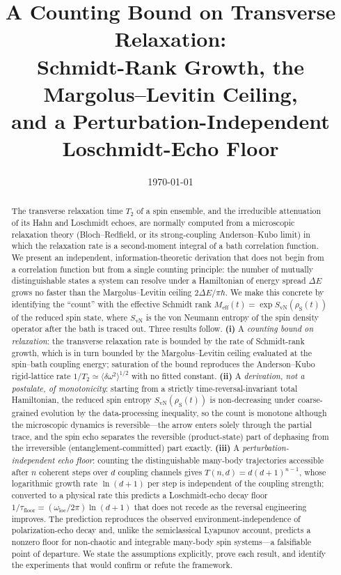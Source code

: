 \documentclass[twocolumn,10pt,a4paper]{article}
\title{\textbf{A Counting Bound on Transverse Relaxation:\\[2pt]
Schmidt-Rank Growth, the Margolus--Levitin Ceiling,\\
and a Perturbation-Independent Loschmidt-Echo Floor}}
\author{}
\date{\today}
\theoremstyle{thmstyle}
\theoremstyle{definition}
\theoremstyle{remark}
\newcommand{\sysrho}{\rho_{\mathrm{S}}}
\newcommand{\Svn}{S_{\mathrm{vN}}}
\newcommand{\Meff}{M_{\mathrm{eff}}}
\newcommand{\Ttwo}{T_{2}}
\begin{document}
\maketitle

\begin{abstract}
\noindent
The transverse relaxation time $\Ttwo$ of a spin ensemble, and the
irreducible attenuation of its Hahn and Loschmidt echoes, are normally
computed from a microscopic relaxation theory (Bloch--Redfield, or its
strong-coupling Anderson--Kubo limit) in which the relaxation rate is a
second-moment integral of a bath correlation function. We present an
independent, information-theoretic derivation that does not begin from a
correlation function but from a single counting principle: the number of
mutually distinguishable states a system can resolve under a Hamiltonian
of energy spread $\Delta E$ grows no faster than the Margolus--Levitin
ceiling $2\Delta E/\pi\hbar$. We make this concrete by identifying the
``count'' with the effective Schmidt rank $\Meff(t)=\exp \Svn(\sysrho(t))$
of the reduced spin state, where $\Svn$ is the von Neumann entropy of the
spin density operator after the bath is traced out. Three results follow.
\textbf{(i)} A \emph{counting bound on relaxation}: the transverse
relaxation rate is bounded by the rate of Schmidt-rank growth, which is
in turn bounded by the Margolus--Levitin ceiling evaluated at the
spin--bath coupling energy; saturation of the bound reproduces the
Anderson--Kubo rigid-lattice rate $1/\Ttwo\simeq\langle\delta\omega^{2}
\rangle^{1/2}$ with no fitted constant. \textbf{(ii)} A \emph{derivation,
not a postulate, of monotonicity}: starting from a strictly
time-reversal-invariant total Hamiltonian, the reduced spin entropy
$\Svn(\sysrho(t))$ is non-decreasing under coarse-grained evolution by
the data-processing inequality, so the count is monotone although the
microscopic dynamics is reversible---the arrow enters solely through the
partial trace, and the spin echo separates the reversible
(product-state) part of dephasing from the irreversible
(entanglement-committed) part exactly. \textbf{(iii)} A
\emph{perturbation-independent echo floor}: counting the distinguishable
many-body trajectories accessible after $n$ coherent steps over $d$
coupling channels gives $T(n,d)=d(d+1)^{n-1}$, whose logarithmic growth
rate $\ln(d{+}1)$ per step is independent of the coupling strength;
converted to a physical rate this predicts a Loschmidt-echo decay floor
$1/\tau_{\mathrm{floor}}=(\omega_{\mathrm{loc}}/2\pi)\ln(d{+}1)$ that does
not recede as the reversal engineering improves. The prediction
reproduces the observed environment-independence of polarization-echo
decay and, unlike the semiclassical Lyapunov account, predicts a nonzero
floor for non-chaotic and integrable many-body spin systems---a
falsifiable point of departure. We state the assumptions explicitly,
prove each result, and identify the experiments that would confirm or
refute the framework.
\end{abstract}
\end{document}
